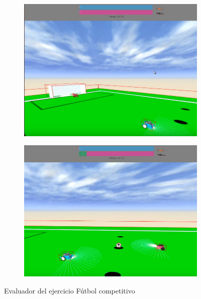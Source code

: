 \begin{figure}[h!]
\begin{subfigure}[b]{0.5\textwidth}
  \end{subfigure}
    \hfill
    \hfill
  \begin{subfigure}[b]{0.5\textwidth}
    \includegraphics[width=\textwidth, height=\textwidth]{evaluador3.png}
  \end{subfigure}
    \hfill
  \begin{subfigure}[b]{0.5\textwidth}
    \includegraphics[width=\textwidth, height=\textwidth]{evaluador4.png}
  \end{subfigure}
\caption{Evaluador del ejercicio Fútbol competitivo}
\label{fig:evaluador}
\end{figure}

